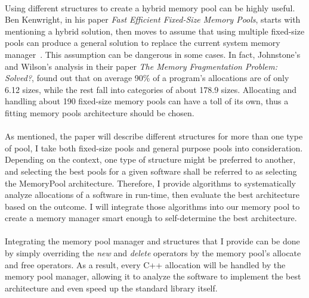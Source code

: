 \documentclass[a4paper, 12pt]{article}
\begin{document}
\paragraph{}
Using different structures to create a hybrid memory pool can be highly useful.
Ben Kenwright, in his paper \textit{Fast Efficient Fixed-Size Memory Pools}, starts with mentioning a hybrid solution, then moves to assume that using multiple fixed-size pools can produce a general solution to replace the current system memory manager~\cite{Kenwright2012FastEF}.
This assumption can be dangerous in some cases.
In fact, Johnstone's and Wilson's analysis in their paper \textit{The Memory Fragmentation Problem: Solved?}, found out that on average 90\% of a program's allocations are of only 6.12 sizes, while the rest fall into categories of about 178.9 sizes\cite{10.1145/301589.286864}.
Allocating and handling about 190 fixed-size memory pools can have a toll of its own, thus a fitting memory pools architecture should be chosen.


\paragraph{}
As mentioned, the paper will describe different structures for more than one type of pool, I take both fixed-size pools and general purpose pools into consideration.
Depending on the context, one type of structure might be preferred to another, and selecting the best pools for a given software shall be referred to as selecting the MemoryPool architecture.
Therefore, I provide algorithms to systematically analyze allocations of a software in run-time, then evaluate the best architecture based on the outcome.
I will integrate those algorithms into our memory pool to create a memory manager smart enough to self-determine the best architecture.

\paragraph{}
Integrating the memory pool manager and structures that I provide can be done by simply overriding the \textit{new} and \textit{delete} operators by the memory pool's allocate and free operators.
As a result, every C++ allocation will be handled by the memory pool manager, allowing it to analyze the software to implement the best architecture and even speed up the standard library itself.
\end{document}
